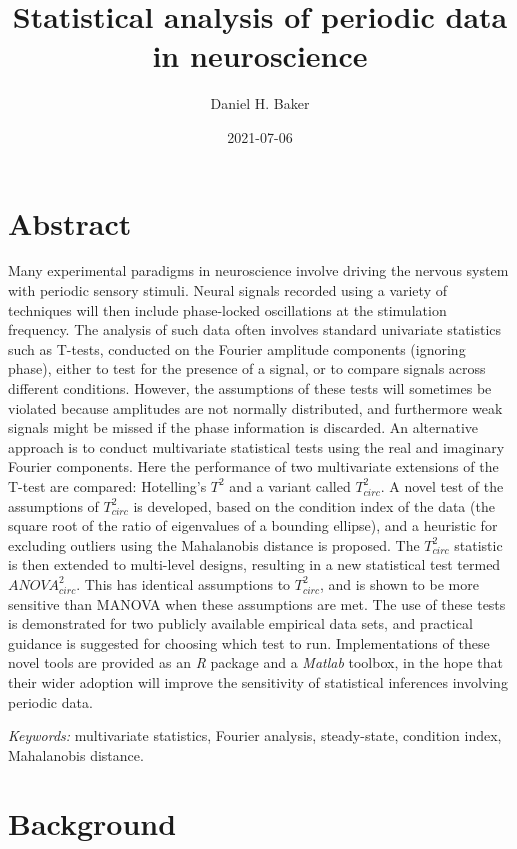 \documentclass[]{article}
\title{Statistical analysis of periodic data in neuroscience}
\author{Daniel H. Baker}
\date{2021-07-06}
\begin{document}
\maketitle

\hypertarget{abstract}{%
\section{Abstract}\label{abstract}}

Many experimental paradigms in neuroscience involve driving the nervous system with periodic sensory stimuli. Neural signals recorded using a variety of techniques will then include phase-locked oscillations at the stimulation frequency. The analysis of such data often involves standard univariate statistics such as T-tests, conducted on the Fourier amplitude components (ignoring phase), either to test for the presence of a signal, or to compare signals across different conditions. However, the assumptions of these tests will sometimes be violated because amplitudes are not normally distributed, and furthermore weak signals might be missed if the phase information is discarded. An alternative approach is to conduct multivariate statistical tests using the real and imaginary Fourier components. Here the performance of two multivariate extensions of the T-test are compared: Hotelling's \(T^2\) and a variant called \(T^2_{circ}\). A novel test of the assumptions of \(T^2_{circ}\) is developed, based on the condition index of the data (the square root of the ratio of eigenvalues of a bounding ellipse), and a heuristic for excluding outliers using the Mahalanobis distance is proposed. The \(T^2_{circ}\) statistic is then extended to multi-level designs, resulting in a new statistical test termed \(ANOVA^2_{circ}\). This has identical assumptions to \(T^2_{circ}\), and is shown to be more sensitive than MANOVA when these assumptions are met. The use of these tests is demonstrated for two publicly available empirical data sets, and practical guidance is suggested for choosing which test to run. Implementations of these novel tools are provided as an \emph{R} package and a \emph{Matlab} toolbox, in the hope that their wider adoption will improve the sensitivity of statistical inferences involving periodic data.

\emph{Keywords:} multivariate statistics, Fourier analysis, steady-state, condition index, Mahalanobis distance.

\hypertarget{background}{%
\section{Background}\label{background}}
\end{document}
